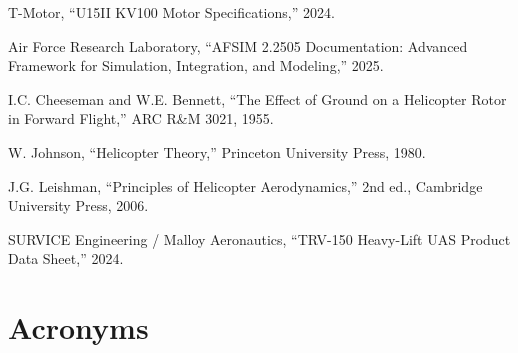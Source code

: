 \documentclass[11pt, letterpaper]{article}
\begin{document}
\unclass [6] T-Motor, ``U15II KV100 Motor Specifications,'' 2024.

\unclass [7] Air Force Research Laboratory, ``AFSIM 2.2505 Documentation: Advanced Framework for Simulation, Integration, and Modeling,'' 2025.

\unclass [8] I.C. Cheeseman and W.E. Bennett, ``The Effect of Ground on a Helicopter Rotor in Forward Flight,'' ARC R\&M 3021, 1955.

\unclass [9] W. Johnson, ``Helicopter Theory,'' Princeton University Press, 1980.

\unclass [10] J.G. Leishman, ``Principles of Helicopter Aerodynamics,'' 2nd ed., Cambridge University Press, 2006.

\unclass [11] SURVICE Engineering / Malloy Aeronautics, ``TRV-150 Heavy-Lift UAS Product Data Sheet,'' 2024.

\pagebreak

\section{\unclass Acronyms}
\end{document}
